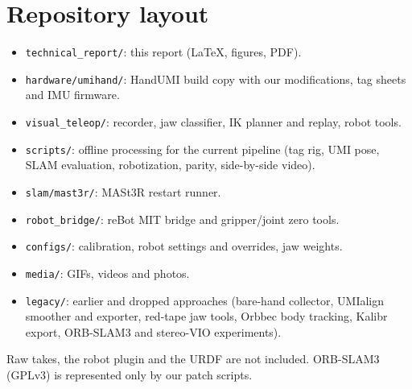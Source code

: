\documentclass[conference,10pt]{IEEEtran}
\begin{document}
\section{Repository layout}\label{app:repo}
\begin{itemize}
\item \texttt{technical\_report/}: this report (LaTeX, figures, PDF).
\item \texttt{hardware/umihand/}: HandUMI build copy with our modifications, tag sheets and IMU firmware.
\item \texttt{visual\_teleop/}: recorder, jaw classifier, IK planner and replay, robot tools.
\item \texttt{scripts/}: offline processing for the current pipeline (tag rig, UMI pose, SLAM evaluation, robotization,
  parity, side-by-side video).
\item \texttt{slam/mast3r/}: MASt3R restart runner.
\item \texttt{robot\_bridge/}: reBot MIT bridge and gripper/joint zero tools.
\item \texttt{configs/}: calibration, robot settings and overrides, jaw weights.
\item \texttt{media/}: GIFs, videos and photos.
\item \texttt{legacy/}: earlier and dropped approaches (bare-hand collector, UMIalign smoother and exporter, red-tape jaw
  tools, Orbbec body tracking, Kalibr export, ORB-SLAM3 and stereo-VIO experiments).
\end{itemize}
Raw takes, the robot plugin and the URDF are not included. ORB-SLAM3 (GPLv3) is represented only by our patch scripts.
\end{document}
